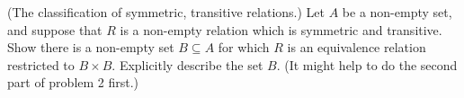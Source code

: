 (The classification of symmetric, transitive relations.) Let $A$ be a non-empty set, and suppose that $R$ is a non-empty relation which is symmetric and transitive. Show there is a non-empty set $B \subseteq A$ for which $R$ is an equivalence relation restricted to $B \times B$. Explicitly describe the set $B$. (It might help to do the second part of problem 2 first.)